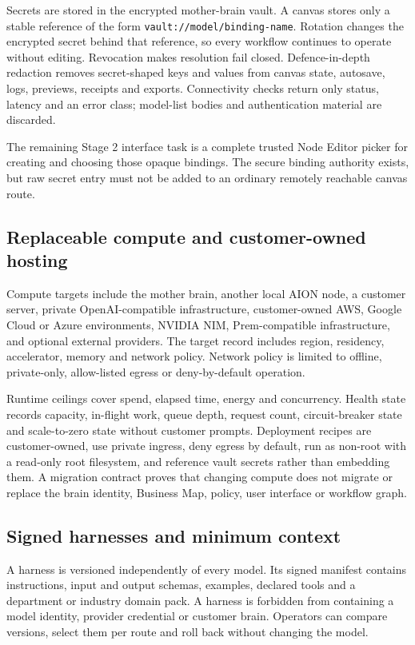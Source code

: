Secrets are stored in the encrypted mother-brain vault.  A canvas stores only a stable reference of
the form \texttt{vault://model/binding-name}.  Rotation changes the encrypted secret behind that
reference, so every workflow continues to operate without editing.  Revocation makes resolution
fail closed.  Defence-in-depth redaction removes secret-shaped keys and values from canvas state,
autosave, logs, previews, receipts and exports.  Connectivity checks return only status, latency and
an error class; model-list bodies and authentication material are discarded.

The remaining Stage 2 interface task is a complete trusted Node Editor picker for creating and
choosing those opaque bindings.  The secure binding authority exists, but raw secret entry must not
be added to an ordinary remotely reachable canvas route.

\subsection{Replaceable compute and customer-owned hosting}

Compute targets include the mother brain, another local AION node, a customer server, private
OpenAI-compatible infrastructure, customer-owned AWS, Google Cloud or Azure environments,
NVIDIA NIM, Prem-compatible infrastructure, and optional external providers.  The target record
includes region, residency, accelerator, memory and network policy.  Network policy is limited to
offline, private-only, allow-listed egress or deny-by-default operation.

Runtime ceilings cover spend, elapsed time, energy and concurrency.  Health state records capacity,
in-flight work, queue depth, request count, circuit-breaker state and scale-to-zero state without
customer prompts.  Deployment recipes are customer-owned, use private ingress, deny egress by
default, run as non-root with a read-only root filesystem, and reference vault secrets rather than
embedding them.  A migration contract proves that changing compute does not migrate or replace the
brain identity, Business Map, policy, user interface or workflow graph.

\subsection{Signed harnesses and minimum context}

A harness is versioned independently of every model.  Its signed manifest contains instructions,
input and output schemas, examples, declared tools and a department or industry domain pack.  A
harness is forbidden from containing a model identity, provider credential or customer brain.
Operators can compare versions, select them per route and roll back without changing the model.

